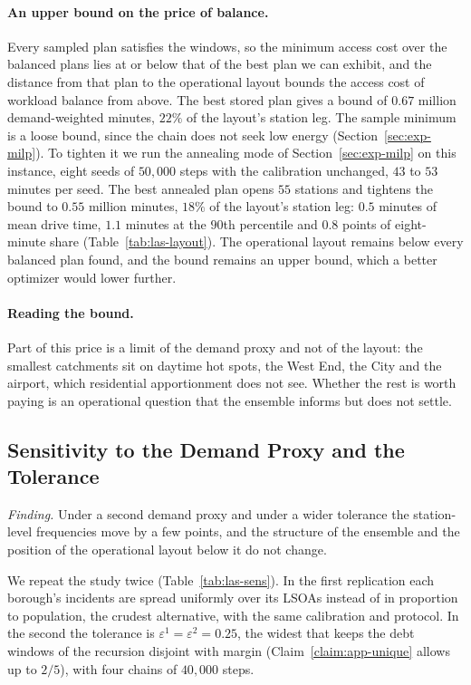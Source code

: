 \documentclass[11pt]{article}
\theoremstyle{definition}
\begin{document}
\paragraph{An upper bound on the price of balance.}
Every sampled plan satisfies the windows, so the minimum access cost over the balanced plans lies at or below that of the best plan we can exhibit, and the distance from that plan to the operational layout bounds the access cost of workload balance from above. The best stored plan gives a bound of $0.67$ million demand-weighted minutes, $22\%$ of the layout's station leg. The sample minimum is a loose bound, since the chain does not seek low energy (Section~\ref{sec:exp-milp}). To tighten it we run the annealing mode of Section~\ref{sec:exp-milp} on this instance, eight seeds of $50{,}000$ steps with the calibration unchanged, $43$ to $53$ minutes per seed. The best annealed plan opens $55$ stations and tightens the bound to $0.55$ million minutes, $18\%$ of the layout's station leg: $0.5$ minutes of mean drive time, $1.1$ minutes at the $90$th percentile and $0.8$ points of eight-minute share (Table~\ref{tab:las-layout}). The operational layout remains below every balanced plan found, and the bound remains an upper bound, which a better optimizer would lower further.

\paragraph{Reading the bound.}
Part of this price is a limit of the demand proxy and not of the layout: the smallest catchments sit on daytime hot spots, the West End, the City and the airport, which residential apportionment does not see. Whether the rest is worth paying is an operational question that the ensemble informs but does not settle.

\subsection{Sensitivity to the Demand Proxy and the Tolerance}\label{sec:las-sensitivity}

\emph{Finding.} Under a second demand proxy and under a wider tolerance the station-level frequencies move by a few points, and the structure of the ensemble and the position of the operational layout below it do not change.

We repeat the study twice (Table~\ref{tab:las-sens}). In the first replication each borough's incidents are spread uniformly over its LSOAs instead of in proportion to population, the crudest alternative, with the same calibration and protocol. In the second the tolerance is $\varepsilon^1 = \varepsilon^2 = 0.25$, the widest that keeps the debt windows of the recursion disjoint with margin (Claim~\ref{claim:app-unique} allows up to $2/5$), with four chains of $40{,}000$ steps.
\end{document}
